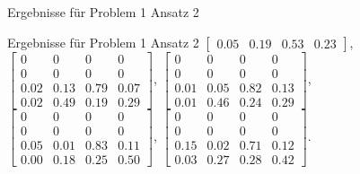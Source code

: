 \documentclass[17pt, fleqn]{beamer}
\begin{document}
\begin{frame}{Ergebnisse für Problem 1 Ansatz 2}
    \begin{scriptsize}
	\end{scriptsize}
\end{frame}

\begin{frame}{Ergebnisse für Problem 1 Ansatz 2}
    \footnotesize{
    $\left[ \begin{array}{rrrr}  0.05 & 0.19 & 0.53 & 0.23  \end{array}\right]$,
    $\left[ \begin{array}{rrrr} 0 & 0 & 0 & 0 \\  0 & 0 & 0 & 0 \\ 0.02 & 0.13 & 0.79 & 0.07 \\ 0.02 & 0.49 & 0.19 & 0.29 \end{array}\right]$,
    $\left[ \begin{array}{rrrr} 0 & 0 & 0 & 0 \\  0 & 0 & 0 & 0 \\ 0.01 & 0.05  & 0.82  & 0.13 \\ 0.01 & 0.46 & 0.24 & 0.29 \end{array}\right]$,
    $\left[ \begin{array}{rrrr} 0 & 0 & 0 & 0 \\  0 & 0 & 0 & 0 \\ 0.05 & 0.01 & 0.83 & 0.11\\ 0.00& 0.18 & 0.25 & 0.50\end{array}\right]$,
    $\left[ \begin{array}{rrrr} 0 & 0 & 0 & 0 \\  0 & 0 & 0 & 0 \\ 0.15& 0.02& 0.71& 0.12\\ 0.03& 0.27& 0.28& 0.42 \end{array}\right]$.
    }
\end{frame}
\end{document}
